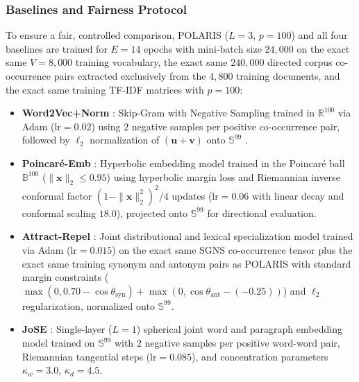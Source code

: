 \documentclass[journal]{IEEEtran}
\begin{document}
\subsubsection{Baselines and Fairness Protocol}
To ensure a fair, controlled comparison, POLARIS ($L=3$, $p=100$) and all four baselines are trained for $E = 14$ epochs with mini-batch size $24,000$ on the exact same $V = 8,000$ training vocabulary, the exact same $240,000$ directed corpus co-occurrence pairs extracted exclusively from the $4,800$ training documents, and the exact same training TF-IDF matrices with $p = 100$:
\begin{itemize}
    \item \textbf{Word2Vec+Norm} \cite{mikolov2013distributed}: Skip-Gram with Negative Sampling trained in $\mathbb{R}^{100}$ via Adam ($\text{lr}=0.02$) using $2$ negative samples per positive co-occurrence pair, followed by $\ell_2$ normalization of $(\mathbf{u} + \mathbf{v})$ onto $\mathbb{S}^{99}$ \cite{levy2014neural}.
    \item \textbf{Poincar\'{e}-Emb} \cite{nickel2017poincare}: Hyperbolic embedding model trained in the Poincar\'{e} ball $\mathbb{B}^{100}$ ($\|\mathbf{x}\|_2 \le 0.95$) using hyperbolic margin loss and Riemannian inverse conformal factor $(1 - \|\mathbf{x}\|_2^2)^2 / 4$ updates ($\text{lr}=0.06$ with linear decay and conformal scaling $18.0$), projected onto $\mathbb{S}^{99}$ for directional evaluation.
    \item \textbf{Attract-Repel} \cite{mrksic2017semantic}: Joint distributional and lexical specialization model trained via Adam ($\text{lr}=0.015$) on the exact same SGNS co-occurrence tensor plus the exact same training synonym and antonym pairs as POLARIS with standard margin constraints ($\max(0, 0.70 - \cos\theta_{\text{syn}}) + \max(0, \cos\theta_{\text{ant}} - (-0.25))$) and $\ell_2$ regularization, normalized onto $\mathbb{S}^{99}$.
    \item \textbf{JoSE} \cite{meng2019spherical}: Single-layer ($L=1$) spherical joint word and paragraph embedding model trained on $\mathbb{S}^{99}$ with $2$ negative samples per positive word-word pair, Riemannian tangential steps ($\text{lr}=0.085$), and concentration parameters $\kappa_w = 3.0$, $\kappa_d = 4.5$.
\end{itemize}
\end{document}

